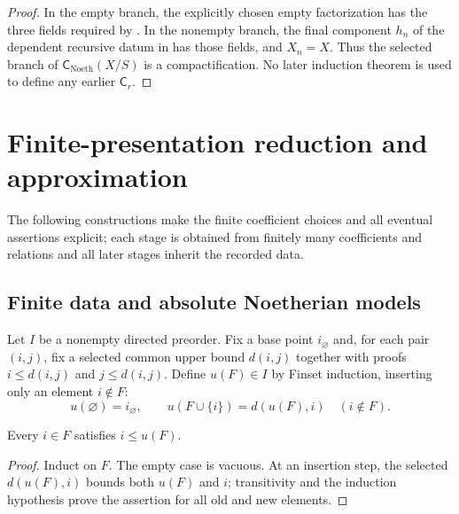 \begin{proof}
  In the empty branch, the explicitly chosen empty factorization has the
  three fields required by .  In the
  nonempty branch, the final component $h_n$ of the dependent recursive datum
  in  has those fields, and
  $X_n=X$.  Thus the selected branch of
  $\mathsf C_{\mathrm{Noeth}}(X/S)$ is a compactification.  No later induction
  theorem is used to define any earlier $\mathsf C_r$.
\end{proof}


\section{Finite-presentation reduction and approximation}

The following constructions make the finite coefficient choices and all
eventual assertions explicit; each stage is obtained from finitely many
coefficients and relations and all later stages inherit the recorded data.

\subsection{Finite data and absolute Noetherian models}

\begin{definition}
  \label{def:nagata-directed-finite-upper-bound}

  Let $I$ be a nonempty directed preorder.  Fix a base point $i_\varnothing$
  and, for each pair $(i,j)$, fix a selected common upper bound $d(i,j)$
  together with proofs $i\leq d(i,j)$ and $j\leq d(i,j)$.  Define
  $u(F)\in I$ by Finset induction, inserting only an element $i\notin F$:
  \[
    u(\varnothing)=i_\varnothing,
    \qquad
    u(F\cup\{i\})=d(u(F),i)\quad(i\notin F).
  \]
\end{definition}

\begin{lemma}
  \label{lemma:nagata-directed-finite-upper-bound}

  Every $i\in F$ satisfies $i\leq u(F)$.
\end{lemma}

\begin{proof}
  Induct on $F$.  The empty case is vacuous.  At an insertion step, the
  selected $d(u(F),i)$ bounds both $u(F)$ and $i$; transitivity and the
  induction hypothesis prove the assertion for all old and new elements.
\end{proof}

